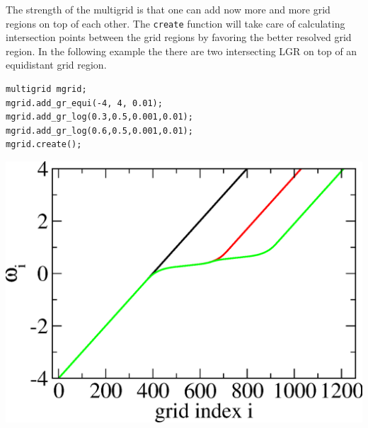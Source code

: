 The strength of the multigrid is that one can add now more and more grid regions on top of each other. The \texttt{create} function will take care of calculating intersection points between the grid regions by favoring the better resolved grid region. In the following example the there are two intersecting LGR on top of an equidistant grid region. 
\\
\vspace{1cm}
\noindent\begin{minipage}[l]{0.6\textwidth}
\begin{lstlisting}
multigrid mgrid;
mgrid.add_gr_equi(-4, 4, 0.01);
mgrid.add_gr_log(0.3,0.5,0.001,0.01);
mgrid.add_gr_log(0.6,0.5,0.001,0.01);
mgrid.create();
\end{lstlisting}
\end{minipage}
\begin{minipage}[]{0.4\textwidth}
	\includegraphics[width=1.0\textwidth]{pics/multigrid_02.eps}
\end{minipage}

